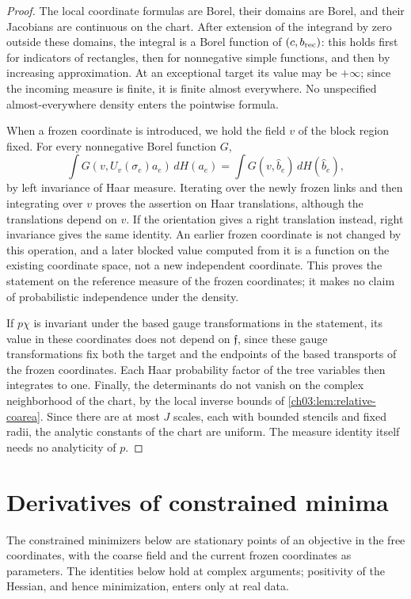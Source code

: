\begin{proof}
The local coordinate formulas are Borel, their domains are Borel, and their Jacobians are continuous on the chart. After extension of the integrand by zero outside these domains, the integral is a Borel function of $(c,b_{\mathrm{rec}})$: this holds first for indicators of rectangles, then for nonnegative simple functions, and then by increasing approximation. At an exceptional target its value may be $+\infty$; since the incoming measure is finite, it is finite almost everywhere. No unspecified almost-everywhere density enters the pointwise formula.

When a frozen coordinate is introduced, we hold the field $v$ of the block region fixed. For every nonnegative Borel function $G$,
\[
 \int G(v,U_v(\sigma_e)a_e)\,dH(a_e)
       =\int G(v,\widehat b_e)\,dH(\widehat b_e),
\]
by left invariance of Haar measure. Iterating over the newly frozen links and then integrating over $v$ proves the assertion on Haar translations, although the translations depend on $v$. If the orientation gives a right translation instead, right invariance gives the same identity. An earlier frozen coordinate is not changed by this operation, and a later blocked value computed from it is a function on the existing coordinate space, not a new independent coordinate. This proves the statement on the reference measure of the frozen coordinates; it makes no claim of probabilistic independence under the density.

If $p\chi$ is invariant under the based gauge transformations in the statement, its value in these coordinates does not depend on $\mathfrak f$, since these gauge transformations fix both the target and the endpoints of the based transports of the frozen coordinates. Each Haar probability factor of the tree variables then integrates to one. Finally, the determinants do not vanish on the complex neighborhood of the chart, by the local inverse bounds of \cref{ch03:lem:relative-coarea}. Since there are at most $J$ scales, each with bounded stencils and fixed radii, the analytic constants of the chart are uniform. The measure identity itself needs no analyticity of $p$.
\end{proof}

\section{Derivatives of constrained minima}\label{ch15:sec:minimum-calculus}

The constrained minimizers below are stationary points of an objective in the free coordinates, with the coarse field and the current frozen coordinates as parameters. The identities below hold at complex arguments; positivity of the Hessian, and hence minimization, enters only at real data.

